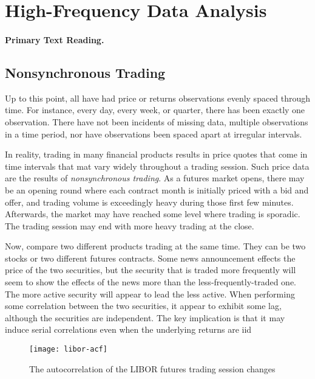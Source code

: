 \section{High-Frequency Data Analysis}\label{High-Frequency}
\paragraph{Primary Text Reading.} 

\subsection{Nonsynchronous Trading}
Up to this point, all \fts{} have had price or returns observations evenly spaced through time. For instance, every day, every week, or quarter, there has been exactly one observation. There have not been incidents of missing data, multiple observations in a time period, nor have observations been spaced apart at irregular intervals.

In reality, trading in many financial products results in price quotes that come in time intervals that mat vary widely throughout a trading session. Such price data are the results of \emph{nonsynchronous trading}. As a futures market opens, there may be an opening round where each contract month is initially priced with a bid and offer, and trading volume is exceedingly heavy during those first few minutes.  Afterwards, the market may have reached some level where trading is sporadic. The trading session may end with more heavy trading at the close.

Now, compare two different products trading at the same time. They can be two stocks or two different futures contracts. Some news announcement effects the price of the two securities, but the security that is traded more frequently will seem to show the effects of the news more than the less-frequently-traded one. The more active security will appear to lead the less active. When performing some correlation between the two securities, it appear to exhibit some lag, although the securities are independent. The key implication is that it may induce serial correlations even when the underlying returns are iid 

\begin{figure}[htb]
	\centering
	\texttt{[image: libor-acf]}
	\caption[LIBOR future autocorrelation]{The autocorrelation of the LIBOR futures trading session changes}
	\label{figure:libor-acf}
\end{figure}

